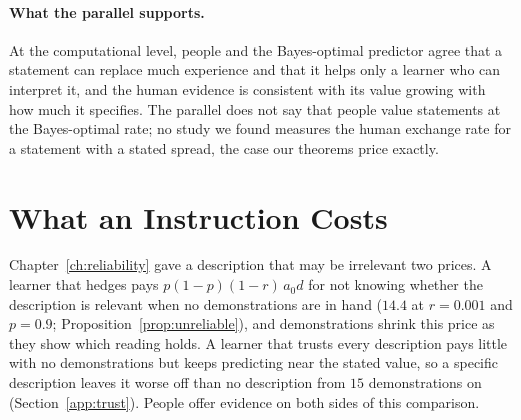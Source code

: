 \paragraph{What the parallel supports.} At the computational level, people and the Bayes-optimal predictor agree that a statement can replace much experience and that it helps only a learner who can interpret it, and the human evidence is consistent with its value growing with how much it specifies. The parallel does not say that people value statements at the Bayes-optimal rate; no study we found measures the human exchange rate for a statement with a stated spread, the case our theorems price exactly.

\section{What an Instruction Costs}\label{sec:hl-cost}
Chapter~\ref{ch:reliability} gave a description that may be irrelevant two prices. A learner that hedges pays $p(1-p)(1-r)\,a_0 d$ for not knowing whether the description is relevant when no demonstrations are in hand ($14.4$ at $r = 0.001$ and $p = 0.9$; Proposition~\ref{prop:unreliable}), and demonstrations shrink this price as they show which reading holds. A learner that trusts every description pays little with no demonstrations but keeps predicting near the stated value, so a specific description leaves it worse off than no description from $15$ demonstrations on (Section~\ref{app:trust}). People offer evidence on both sides of this comparison.

